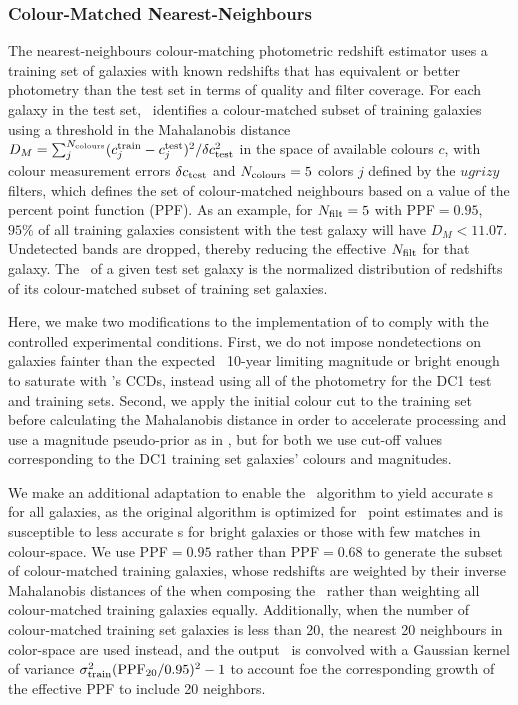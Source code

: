 \subsubsection{Colour-Matched Nearest-Neighbours}

The nearest-neighbours colour-matching photometric redshift estimator \citep[\cmnn,][]{Graham:17} uses a training set of galaxies with known redshifts that has equivalent or better photometry than the test set in terms of quality and filter coverage.
For each galaxy in the test set, \cmnn\ identifies a colour-matched subset of training galaxies using a threshold in the Mahalanobis distance $D_M = \sum_{j}^{N_{\rm colours}} (c^{\rm train}_{j} - c^{\rm test}_{j})^{2} / \delta c_{\rm test}^2$ in the space of available colours $c$, with colour measurement errors $\delta c_{\rm test}$ and $N_{\rm colours} = 5$ colors $j$ defined by the $ugrizy$ filters, which defines the set of colour-matched neighbours based on a value of the percent point function (PPF).
As an example, for $N_{\rm{filt}}=5$ with PPF$=0.95$, $95\%$ of all training galaxies consistent with the test galaxy will have $D_M < 11.07$.
Undetected bands are dropped, thereby reducing the effective $N_{\rm{filt}}$ for that galaxy.
The \pzpdf\ of a given test set galaxy is the normalized distribution of redshifts of its colour-matched subset of training set galaxies.

Here, we make two modifications to the implementation of \citet{Graham:17} to comply with the controlled experimental conditions.
First, we do not impose nondetections on galaxies fainter than the expected \lsst\ 10-year limiting magnitude or bright enough to saturate with \lsst's CCDs, instead using all of the photometry for the DC1 test and training sets.
Second, we apply the initial colour cut to the training set before calculating the Mahalanobis distance in order to accelerate processing and use a magnitude pseudo-prior as in \citet{Graham:17}, but for both we use cut-off values corresponding to the DC1 training set galaxies' colours and magnitudes.

We make an additional adaptation to enable the \cmnn\ algorithm to yield accurate \pzpdf s for all galaxies, as the original \citet{Graham:17} algorithm is optimized for \pz\ point estimates and is susceptible to less accurate \pzpdf s for bright galaxies or those with few matches in colour-space.
We use PPF$=0.95$ rather than PPF$=0.68$ to generate the subset of colour-matched training galaxies, whose redshifts are weighted by their inverse Mahalanobis distances of the when composing the \pzpdf\ rather than weighting all colour-matched training galaxies equally.
Additionally, when the number of colour-matched training set galaxies is less than 20, the nearest 20 neighbours in color-space are used instead, and the output \pzpdf\ is convolved with a Gaussian kernel of variance $\sigma_{\rm train}^{2}({\rm PPF}_{20}/0.95)^2 -1$ to account foe the corresponding growth of the effective PPF to include 20 neighbors.

